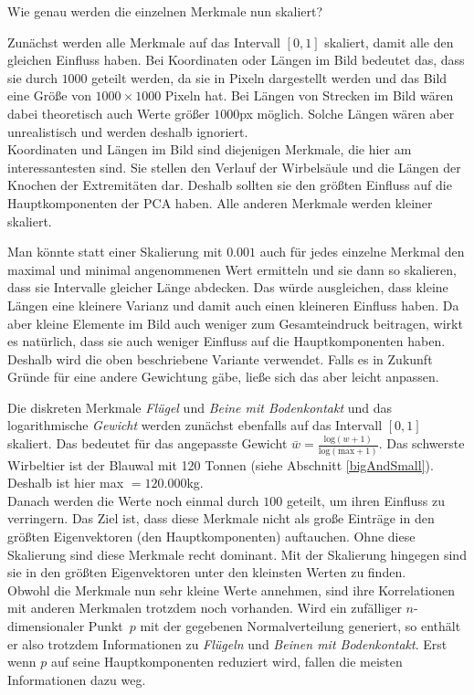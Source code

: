  Wie genau werden die einzelnen Merkmale nun skaliert?
 
 Zunächst werden alle Merkmale auf das Intervall $[0, 1]$ skaliert, damit alle den gleichen Einfluss haben.
 Bei Koordinaten oder Längen im Bild bedeutet das, dass sie durch $1000$ geteilt werden, da sie in Pixeln dargestellt werden und das Bild eine Größe von $1000 \times 1000$ Pixeln hat. Bei Längen von Strecken im Bild wären dabei theoretisch auch Werte größer $1000$px möglich. Solche Längen wären aber unrealistisch und werden deshalb ignoriert.\\
 Koordinaten und Längen im Bild sind diejenigen Merkmale, die hier am interessantesten sind. Sie stellen den Verlauf der Wirbelsäule und die Längen der Knochen der Extremitäten dar. Deshalb sollten sie den größten Einfluss auf die Hauptkomponenten der PCA haben. Alle anderen Merkmale werden kleiner skaliert.
 
 Man könnte statt einer Skalierung mit $0.001$ auch für jedes einzelne Merkmal den maximal und minimal angenommenen Wert ermitteln und sie dann so skalieren, dass sie Intervalle gleicher Länge abdecken. Das würde ausgleichen, dass \zb kleine Längen eine kleinere Varianz und damit auch einen kleineren Einfluss haben.
 Da aber kleine Elemente im Bild auch weniger zum Gesamteindruck beitragen, wirkt es natürlich, dass sie auch weniger Einfluss auf die Hauptkomponenten haben.
 Deshalb wird die oben beschriebene Variante verwendet. Falls es in Zukunft Gründe für eine andere Gewichtung gäbe, ließe sich das aber leicht anpassen.
 
 Die diskreten Merkmale \emph{Flügel} und \emph{Beine mit Bodenkontakt} und das logarithmische \emph{Gewicht} werden zunächst ebenfalls auf das Intervall $[0, 1]$ skaliert. Das bedeutet für das angepasste Gewicht $\bar{w} = \frac{\mathrm{log}(w+1)}{\mathrm{log}(\mathrm{max}+1)}$. Das schwerste Wirbeltier ist der Blauwal mit 120 Tonnen (siehe Abschnitt \ref{bigAndSmall}). Deshalb ist hier max $= 120.000$kg.\\
 Danach werden die Werte noch einmal durch $100$ geteilt, um ihren Einfluss zu verringern. Das Ziel ist, dass diese Merkmale nicht als große Einträge in den größten Eigenvektoren (den Hauptkomponenten) auftauchen. Ohne diese Skalierung sind diese Merkmale recht dominant. Mit der Skalierung hingegen sind sie in den größten Eigenvektoren unter den kleinsten Werten zu finden.\\
 Obwohl die Merkmale nun sehr kleine Werte annehmen, sind ihre Korrelationen mit anderen Merkmalen trotzdem noch vorhanden. Wird ein zufälliger $n$-dimensionaler \mbox{Punkt $p$} mit der gegebenen Normalverteilung generiert, so enthält er also trotzdem Informationen zu \emph{Flügeln} und \emph{Beinen mit Bodenkontakt}. Erst wenn $p$ auf seine Hauptkomponenten reduziert wird, fallen die meisten Informationen dazu weg.
 
